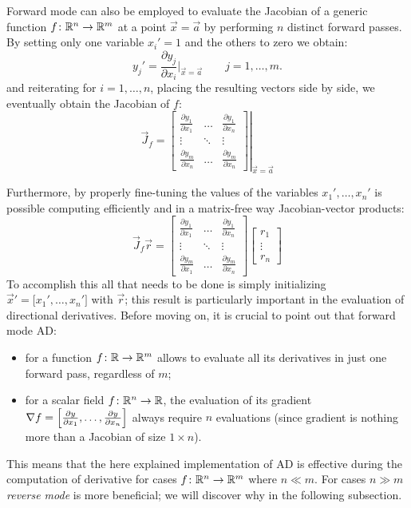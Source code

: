 \medskip
Forward mode can also be employed to evaluate the Jacobian of a generic function $f \colon \mathbb{R}^n \to \mathbb{R}^m$ at a point $\vec{x} = \vec{a}$ by performing $n$ distinct forward passes. By setting only one variable $x_i'=1$ and the others to zero we obtain:
\[
	y_j' = \frac{\partial y_j}{\partial x_i}\bigg|_{\vec{x}=\vec{a}} \qquad j=1,\dots,m.
\]
and reiterating for $ i=1,\dots,n$, placing the resulting vectors side by side, we eventually obtain the Jacobian of $f$:
\[
\vec{J}_f =
\left.
\begin{bmatrix}
	\frac{\partial y_1}{\partial x_1} &  \dots  & \frac{\partial y_1}{\partial x_n}  \\
	\vdots							  & \ddots  & \vdots							 \\
	\frac{\partial y_m}{\partial x_n} &  \dots  & \frac{\partial y_m}{\partial x_n}
\end{bmatrix}
\right|_{\vec{x} = \vec{a}}
\]

Furthermore, by properly fine-tuning the values of the variables $x_1', \dots, x_n'$ is possible computing efficiently and in a matrix-free way Jacobian-vector products:
\[
\vec{J}_f \vec{r} =
\begin{bmatrix}
	\frac{\partial y_1}{\partial x_1} &  \dots  & \frac{\partial y_1}{\partial x_n}  \\
	\vdots							  & \ddots  & \vdots							 \\
	\frac{\partial y_m}{\partial x_1} &  \dots  & \frac{\partial y_m}{\partial x_n}
\end{bmatrix}
\begin{bmatrix}
	r_1		\\
	\vdots  \\
	r_n
\end{bmatrix}
\]
To accomplish this all that needs to be done is simply initializing $\vec{x}'=\big[x_1', \dots, x_n' \big]$ with $\vec{r}$; this result is particularly important in the evaluation of directional derivatives.
Before moving on, it is crucial to point out that forward mode AD:
\begin{itemize}
	\item for a function $f \colon \mathbb{R} \to \mathbb{R}^m$ allows to evaluate all its derivatives in just one forward pass, regardless of $m$;
	\item for a scalar field $f \colon \mathbb{R}^n \to \mathbb{R}$, the evaluation of its gradient $\nabla f = \Bigl[ \frac{\partial y}{\partial x_1}, \dots, \frac{\partial y}{\partial x_n} \Bigr]$ always require $n$ evaluations (since gradient is nothing more than a Jacobian of size $1 \times n$).
\end{itemize}
This means that the here explained implementation of AD is effective during the computation of derivative for cases $f \colon \mathbb{R}^n \to \mathbb{R}^m$ where $n \ll m$. For cases $n \gg m$ \emph{reverse mode} is more beneficial; we will discover why in the following subsection.

